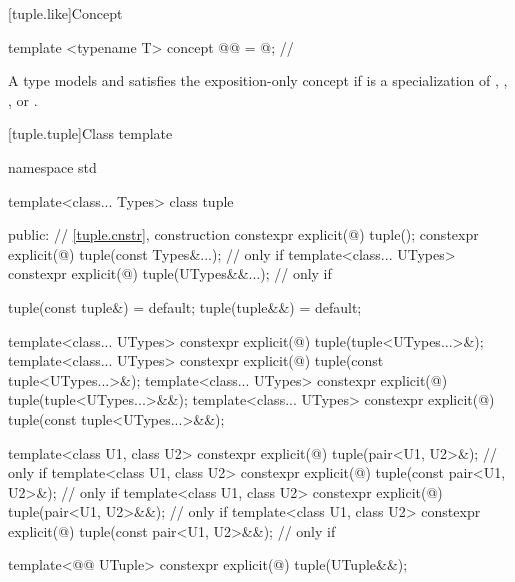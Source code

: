 [tuple.like]{Concept }

\begin{itemdecl}
template <typename T>
  concept @@ = @\seebelownc@;           // \expos
\end{itemdecl}

\begin{itemdescr}
\pnum
A type  models and satisfies
the exposition-only concept 
if  is a specialization of
, , , or .
\end{itemdescr}

[tuple.tuple]{Class template }
%

\begin{codeblock}
namespace std {
  template<class... Types>
  class tuple {
  public:
    // \ref{tuple.cnstr},  construction
    constexpr explicit(@\seebelow@) tuple();
    constexpr explicit(@\seebelow@) tuple(const Types&...);         // only if 
    template<class... UTypes>
      constexpr explicit(@\seebelow@) tuple(UTypes&&...);           // only if 

    tuple(const tuple&) = default;
    tuple(tuple&&) = default;

    template<class... UTypes>
      constexpr explicit(@\seebelow@) tuple(tuple<UTypes...>&);
    template<class... UTypes>
      constexpr explicit(@\seebelow@) tuple(const tuple<UTypes...>&);
    template<class... UTypes>
      constexpr explicit(@\seebelow@) tuple(tuple<UTypes...>&&);
    template<class... UTypes>
      constexpr explicit(@\seebelow@) tuple(const tuple<UTypes...>&&);

    template<class U1, class U2>
      constexpr explicit(@\seebelow@) tuple(pair<U1, U2>&);         // only if 
    template<class U1, class U2>
      constexpr explicit(@\seebelow@) tuple(const pair<U1, U2>&);   // only if 
    template<class U1, class U2>
      constexpr explicit(@\seebelow@) tuple(pair<U1, U2>&&);        // only if 
    template<class U1, class U2>
      constexpr explicit(@\seebelow@) tuple(const pair<U1, U2>&&);  // only if 

    template<@@ UTuple>
      constexpr explicit(@\seebelow@) tuple(UTuple&&);

}}
\end{codeblock}
